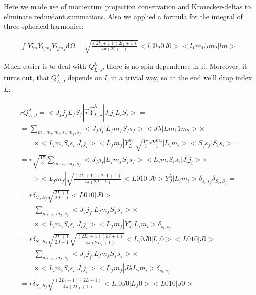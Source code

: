 Here we made use of momentum projection conservation and Kronecker-deltas to eliminate redundant summations. Also we applied a formula for the integral of three spherical harmonics:

\begin{align}
    \int Y^{\star}_{l m} Y_{l_1 m_1} Y_{l_2 m_2} \mathrm{d} \Omega = \sqrt{\frac{(2l_1+1)(2l_2+1)}{4 \pi (2l+1)}} <l_1 0 l_2 0 | l 0> <l_1 m_1 l_2 m_2 | l m>
\end{align}

Much easier is to deal with $Q_{L, J}^\lambda$, there is no spin dependence in it. Moreover, it turns out, that $Q_{L, J}^{\lambda}$ depends on $L$ in a trivial way, so at the end we'll drop index $L$:

\begin{align}
    \begin{split}
        &r Q_{L, J}^\lambda = <J_f j_f L_f S_f|\vec{r} \vec{Y}^{\lambda}_{L, J}|J_i j_i L_i S_i> = \\
        &= \sum_{m_1, m_2, m_i, s_i, m_f, s_f} <J_f j_f| L_f m_f S_f s_f> <J \lambda| L m_1 1 m_2> \times \\
        &\qquad\times <L_i m_i S_i s_i | J_i j_i> <L_f m_f| Y_L^{m_1} \sqrt{\frac{4 \pi}{3}} r Y_{1}^{m_2}|L_i m_i> <S_f s_f|S_i s_i> = \\
        &= r \sqrt{\frac{4 \pi}{3}} \sum_{m_i, s_i, m_f, s_f} <J_f j_f| L_f m_f S_f s_f> <L_i m_i S_i s_i | J_i j_i> \times \\
        &\qquad\times <L_f m_f| \sqrt{\frac{(2L+1)(2\cdot1+1)}{4 \pi (2J + 1)}} <L 0 1 0 | J 0> Y_J^\lambda|L_i m_i> \delta_{s_i, s_f} \delta_{S_i, S_f} = \\
        &= r \delta_{S_i, S_f} \sqrt{\frac{2L+1}{2J+1}} <L 0 1 0 | J 0> \\
        &\qquad\sum_{m_i, s_i, m_f, s_f} <J_f j_f| L_f m_f S_f s_f> \times \\
        &\qquad\times <L_i m_i S_i s_i | J_i j_i> <L_f m_f| Y_J^\lambda |L_i m_i> \delta_{s_i, s_f} = \\
        &= r \delta_{S_i, S_f} \sqrt{\frac{2L+1}{2J+1}} \sqrt{\frac{(2L_i+1)(2J+1)}{4 \pi (2L_f+1)}} <L_i 0 J 0 | L_f 0> <L 0 1 0 | J 0> \\
        &\qquad \sum_{m_i, s_i, m_f, s_f} <J_f j_f| L_f m_f S_f s_f> \times \\
        &\qquad\times <L_i m_i S_i s_i | J_i j_i> <L_f m_f| J \lambda L_i m_i> \delta_{s_i, s_f} = \\
        &= r \delta_{S_i, S_f} \sqrt{\frac{(2L_i+1)(2L+1)}{4 \pi (2L_f+1)}} <L_i 0 J 0 | L_f 0> <L 0 1 0 | J 0> \\

\end{split}
\end{align}
